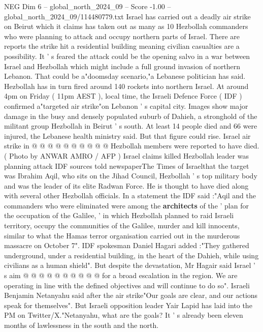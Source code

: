 \begin{textsample}{NEG Dim 6 – global\_north\_2024\_09 – Score -1.00 – global\_north\_2024\_09/114480779.txt}  \label{ex:f6_neg_021}
Israel has carried out a deadly air strike on Beirut which it claims has taken out as many as 10 Hezbollah commanders who were planning to attack and occupy northern parts of Israel.
There are reports the strike hit a residential building meaning civilian casualties are a possibility.
It ' s feared the attack could be the opening salvo in a war between Israel and Hezbollah which might include a full ground invasion of northern Lebanon.
That could be a"doomsday scenario,"a Lebanese politician has said.
Hezbollah has in turn fired around 140 rockets into northern Israel.
At around 4pm on Friday ( 11pm AEST ), local time, the Israeli Defence Force ( IDF ) confirmed a"targeted air strike"on Lebanon ' s capital city.
Images show major damage in the busy and densely populated suburb of Dahieh, a stronghold of the militant group Hezbollah in Beirut ' s south.
At least 14 people died and 66 were injured, the Lebanese health ministry said.
But that figure could rise.
Israel air strike in @ @ @ @ @ @ @ @ @ @ Hezbollah members were reported to have died. ( Photo by ANWAR AMRO / AFP ) Israel claims killed Hezbollah leader was planning attack IDF sources told newspaperThe Times of Israelthat the target was Ibrahim Aqil, who sits on the Jihad Council, Hezbollah ' s top military body and was the leader of its elite Radwan Force.
He is thought to have died along with several other Hezbollah officials.
In a statement the IDF said :"Aqil and the commanders who were eliminated were among the \textbf{architects} of the ' plan for the occupation of the Galilee, ' in which Hezbollah planned to raid Israeli territory, occupy the communities of the Galilee, murder and kill innocents, similar to what the Hamas terror organisation carried out in the murderous massacre on October 7".
IDF spokesman Daniel Hagari added :"They gathered underground, under a residential building, in the heart of the Dahieh, while using civilians as a human shield".
But despite the devastation, Mr Hagair said Israel ' s aim @ @ @ @ @ @ @ @ @ @ for a broad escalation in the region.
We are operating in line with the defined objectives and will continue to do so".
Israeli Benjamin Netanyahu said after the air strike"Our goals are clear, and our actions speak for themselves".
But Israeli opposition leader Yair Lapid has laid into the PM on Twitter/X."Netanyahu, what are the goals?
It ' s already been eleven months of lawlessness in the south and the north.

\end{textsample}
